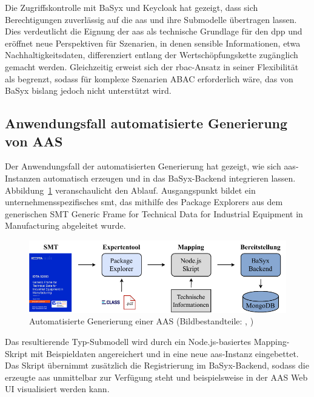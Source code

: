 Die Zugriffskontrolle mit BaSyx und Keycloak hat gezeigt, dass sich Berechtigungen zuverlässig auf die \acs{aas} und ihre Submodelle übertragen lassen. 
Dies verdeutlicht die Eignung der \acs{aas} als technische Grundlage für den \acs{dpp} und eröffnet neue Perspektiven für Szenarien, in denen sensible Informationen, etwa Nachhaltigkeitsdaten, differenziert entlang der Wertschöpfungskette zugänglich gemacht werden. 
Gleichzeitig erweist sich der \acs{rbac}-Ansatz in seiner Flexibilität als begrenzt, sodass für komplexe Szenarien ABAC erforderlich wäre, das von BaSyx bislang jedoch nicht unterstützt wird.

\newpage
\subsection{Anwendungsfall automatisierte Generierung von AAS}

Der Anwendungsfall der automatisierten Generierung hat gezeigt, wie sich \acs{aas}-Instanzen automatisch erzeugen und in das BaSyx-Backend integrieren lassen.
Abbildung~\ref{fig:AutomatisierteGenerierungAblauf} veranschaulicht den Ablauf.
Ausgangspunkt bildet ein unternehmensspezifisches \acs{smt}, das mithilfe des Package Explorers aus dem generischen SMT Generic Frame for Technical Data for Industrial Equipment in Manufacturing \cite{SpezifikaitonTechnischeDaten} abgeleitet wurde.

\vspace{-0.5em}
\begin{figure}[htbp]
    \centering
        \includegraphics[width=\textwidth]{Bilder/ErgebnisseAutomatisierteGenerierung/ARchitekturTest.pdf}
    \caption[Automatisierte Generierung einer AAS]{Automatisierte Generierung einer AAS (Bildbestandteile: \cite{SpezifikaitonTechnischeDaten}, \cite{ECLASSLogo})}
    \label{fig:AutomatisierteGenerierungAblauf}
\end{figure}
\vspace{-0.5em}

Das resultierende Typ-Submodell wird durch ein Node.js-basiertes Mapping-Skript mit Beispieldaten angereichert und in eine neue \acs{aas}-Instanz eingebettet. 
Das Skript übernimmt zusätzlich die Registrierung im BaSyx-Backend, sodass die erzeugte \acs{aas} unmittelbar zur Verfügung steht und beispielsweise in der AAS Web UI visualisiert werden kann.

